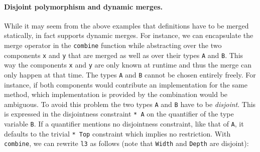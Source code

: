 \paragraph{Disjoint polymorphism and dynamic merges.}

While it may seem from the above examples that definitions have to be merged
statically, \sedel in fact supports dynamic merges. For instance, we can
encapsulate the merge operator in the \lstinline{combine} function while
abstracting over the two components \lstinline{x} and \lstinline{y} that are merged
as well as over their types \lstinline{A} and \lstinline{B}.
This way the components \lstinline{x} and \lstinline{y} are only known at runtime and
thus the merge can only happen at that time.
The types \lstinline{A} and \lstinline{B} cannot be chosen entirely freely. For
instance, if both components would contribute an implementation for the same
method, which implementation is provided by the combination would be ambiguous.
To avoid this problem the two types \lstinline{A} and \lstinline{B} have to be
\emph{disjoint}. This is expressed in the disjointness constraint \lstinline{* A}
on the quantifier of the type variable \lstinline{B}. If a quantifier mentions
no disjointness constraint, like that of \lstinline{A}, it defaults to the
trivial \lstinline{* Top} constraint which implies no restriction. With \lstinline{combine},
we can rewrite \lstinline{l3} as follows (note that \lstinline{Width} and \lstinline{Depth} are disjoint):




